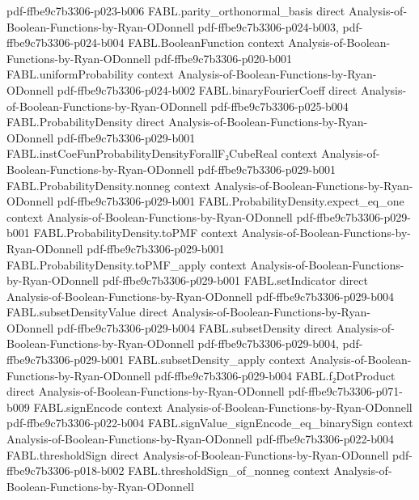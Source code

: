 \begin{theorem}
  {pdf-ffbe9c7b3306-p023-b006}
\proofstep
  {FABL.parity_orthonormal_basis}
  {direct}
  {Analysis-of-Boolean-Functions-by-Ryan-ODonnell}
  {pdf-ffbe9c7b3306-p024-b003,
    pdf-ffbe9c7b3306-p024-b004}
\proofstep
  {FABL.BooleanFunction}
  {context}
  {Analysis-of-Boolean-Functions-by-Ryan-ODonnell}
  {pdf-ffbe9c7b3306-p020-b001}
\proofstep
  {FABL.uniformProbability}
  {context}
  {Analysis-of-Boolean-Functions-by-Ryan-ODonnell}
  {pdf-ffbe9c7b3306-p024-b002}
\proofstep
  {FABL.binaryFourierCoeff}
  {direct}
  {Analysis-of-Boolean-Functions-by-Ryan-ODonnell}
  {pdf-ffbe9c7b3306-p025-b004}
\proofstep
  {FABL.ProbabilityDensity}
  {direct}
  {Analysis-of-Boolean-Functions-by-Ryan-ODonnell}
  {pdf-ffbe9c7b3306-p029-b001}
\proofstep
  {FABL.instCoeFunProbabilityDensityForallF₂CubeReal}
  {context}
  {Analysis-of-Boolean-Functions-by-Ryan-ODonnell}
  {pdf-ffbe9c7b3306-p029-b001}
\proofstep
  {FABL.ProbabilityDensity.nonneg}
  {context}
  {Analysis-of-Boolean-Functions-by-Ryan-ODonnell}
  {pdf-ffbe9c7b3306-p029-b001}
\proofstep
  {FABL.ProbabilityDensity.expect_eq_one}
  {context}
  {Analysis-of-Boolean-Functions-by-Ryan-ODonnell}
  {pdf-ffbe9c7b3306-p029-b001}
\proofstep
  {FABL.ProbabilityDensity.toPMF}
  {context}
  {Analysis-of-Boolean-Functions-by-Ryan-ODonnell}
  {pdf-ffbe9c7b3306-p029-b001}
\proofstep
  {FABL.ProbabilityDensity.toPMF_apply}
  {context}
  {Analysis-of-Boolean-Functions-by-Ryan-ODonnell}
  {pdf-ffbe9c7b3306-p029-b001}
\proofstep
  {FABL.setIndicator}
  {direct}
  {Analysis-of-Boolean-Functions-by-Ryan-ODonnell}
  {pdf-ffbe9c7b3306-p029-b004}
\proofstep
  {FABL.subsetDensityValue}
  {direct}
  {Analysis-of-Boolean-Functions-by-Ryan-ODonnell}
  {pdf-ffbe9c7b3306-p029-b004}
\proofstep
  {FABL.subsetDensity}
  {direct}
  {Analysis-of-Boolean-Functions-by-Ryan-ODonnell}
  {pdf-ffbe9c7b3306-p029-b004,
    pdf-ffbe9c7b3306-p029-b001}
\proofstep
  {FABL.subsetDensity_apply}
  {context}
  {Analysis-of-Boolean-Functions-by-Ryan-ODonnell}
  {pdf-ffbe9c7b3306-p029-b004}
\proofstep
  {FABL.f₂DotProduct}
  {direct}
  {Analysis-of-Boolean-Functions-by-Ryan-ODonnell}
  {pdf-ffbe9c7b3306-p071-b009}
\proofstep
  {FABL.signEncode}
  {context}
  {Analysis-of-Boolean-Functions-by-Ryan-ODonnell}
  {pdf-ffbe9c7b3306-p022-b004}
\proofstep
  {FABL.signValue_signEncode_eq_binarySign}
  {context}
  {Analysis-of-Boolean-Functions-by-Ryan-ODonnell}
  {pdf-ffbe9c7b3306-p022-b004}
\proofstep
  {FABL.thresholdSign}
  {direct}
  {Analysis-of-Boolean-Functions-by-Ryan-ODonnell}
  {pdf-ffbe9c7b3306-p018-b002}
\proofstep
  {FABL.thresholdSign_of_nonneg}
  {context}
  {Analysis-of-Boolean-Functions-by-Ryan-ODonnell}

\end{theorem}
